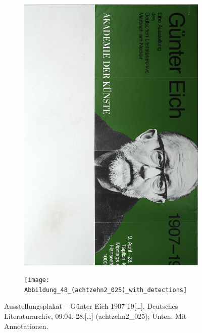 \documentclass[a4paper,12pt,ngerman]{article}
\begin{document}
\newpage
\begin{figure}[ht]
	\begin{subfigure}[b]{\linewidth}
	\centering
	\includegraphics[height=\linewidth, angle=90]{Abbildung_52_(achtzehn2_025)}
	\end{subfigure}
	\begin{subfigure}[b]{\linewidth}
	\centering
	\texttt{[image: Abbildung\_48\_(achtzehn2\_025)\_with\_detections]}
	\end{subfigure}
	\caption{Ausstellungsplakat – Günter Eich 1907-19[…], Deutsches Literaturarchiv, 09.04.-28.[…] (achtzehn2\_025); Unten: Mit Annotationen.}
\end{figure}
\end{document}
